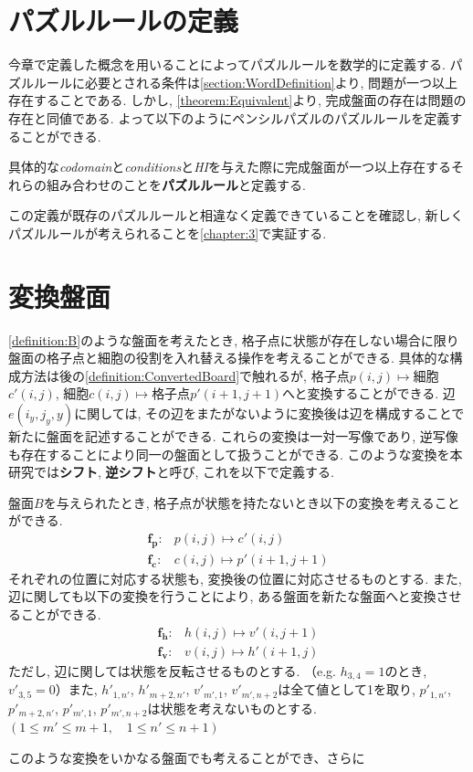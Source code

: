 \section{パズルルールの定義}
今章で定義した概念を用いることによってパズルルールを数学的に定義する. パズルルールに必要とされる条件は\cref{section:WordDefinition}より, 問題が一つ以上存在することである. しかし, \cref{theorem:Equivalent}より, 完成盤面の存在は問題の存在と同値である. よって以下のようにペンシルパズルのパズルルールを定義することができる.
\begin{definition}[パズルルール]\label{definition:PuzzleRule}
  具体的な\textit{codomain}と\textit{conditions}と\textit{HI}を与えた際に完成盤面が一つ以上存在するそれらの組み合わせのことを\textbf{パズルルール}と定義する.
\end{definition}
この定義が既存のパズルルールと相違なく定義できていることを確認し, 新しくパズルルールが考えられることを\cref{chapter:3}で実証する.

\section{変換盤面}\label{section:ConvertedBoard}
\cref{definition:B}のような盤面を考えたとき, 格子点に状態が存在しない場合に限り盤面の格子点と細胞の役割を入れ替える操作を考えることができる. 具体的な構成方法は後の\cref{definition:ConvertedBoard}で触れるが, 格子点$p(i,j)\mapsto$細胞$c'(i,j)$, 細胞$c(i,j)\mapsto$格子点$p'(i+1,j+1)$へと変換することができる. 辺$e(i_y,j_y,y)$に関しては, その辺をまたがないように変換後は辺を構成することで新たに盤面を記述することができる. これらの変換は一対一写像であり, 逆写像も存在することにより同一の盤面として扱うことができる. このような変換を本研究では\textbf{シフト}, \textbf{逆シフト}と呼び, これを以下で定義する.
\begin{definition}\label{definition:ConvertedBoard}
  盤面$B$を与えられたとき, 格子点が状態を持たないとき以下の変換を考えることができる.
  \begin{align*}
    \bm{f_p}\colon & p(i,j)  \longmapsto c'(i,j)     \\
    \bm{f_c}\colon & c(i,j)  \longmapsto p'(i+1,j+1)
  \end{align*}
  それぞれの位置に対応する状態も, 変換後の位置に対応させるものとする. また, 辺に関しても以下の変換を行うことにより, ある盤面を新たな盤面へと変換させることができる.
  \begin{align*}
    \bm{f_h}\colon & h(i,j)  \longmapsto v'(i,j+1) \\
    \bm{f_v}\colon & v(i,j)  \longmapsto h'(i+1,j)
  \end{align*}
  ただし, 辺に関しては状態を反転させるものとする. （e.g. $h_{3,4}=1$のとき, $v'_{3,5}=0$）また, $h'_{1,n'}$, $h'_{m+2,n'}$, $v'_{m',1}$, $v'_{m',n+2}$は全て値として1を取り, $p'_{1,n'}$, $p'_{m+2,n'}$, $p'_{m',1}$, $p'_{m',n+2}$は状態を考えないものとする. $(1\leq m' \leq m+1, \quad 1\leq n'\leq n+1)$

  このような変換をいかなる盤面でも考えることができ、さらに
\end{definition}




